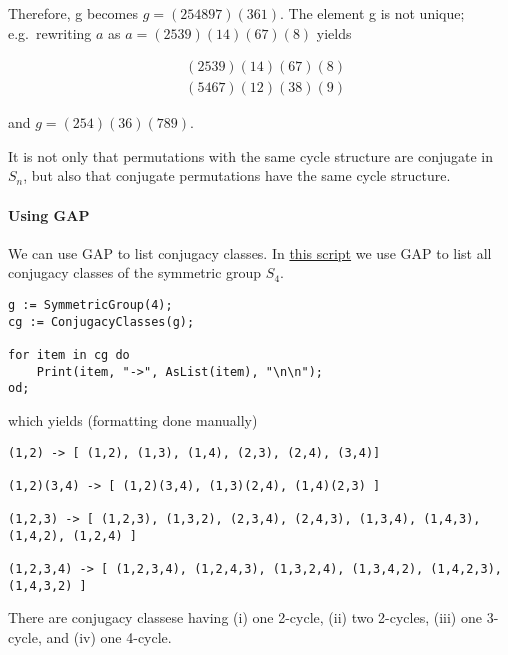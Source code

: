 Therefore, g becomes \(g=(254897)(361)\). The element g is not unique;
e.g.~rewriting \(a\) as \(a=(2539)(14)(67)(8)\) yields


\begin{align*}
&(2539)(14)(67)(8) \\
&(5467)(12)(38)(9)
\end{align*}


and \(g=(254)(36)(789)\).

It is not only that permutations with the same cycle structure are
conjugate in \(S_n\), but also that conjugate permutations have the same
cycle structure.

\paragraph{Using GAP}\label{using-gap}

We can use GAP to list conjugacy classes. In
\href{\%7Bfilename\%7D/files/conjugacy.g}{this script} we use GAP to
list all conjugacy classes of the symmetric group \(S_4\).

\begin{verbatim}
g := SymmetricGroup(4);
cg := ConjugacyClasses(g);

for item in cg do
    Print(item, "->", AsList(item), "\n\n");
od;
\end{verbatim}

which yields (formatting done manually)

\begin{verbatim}
(1,2) -> [ (1,2), (1,3), (1,4), (2,3), (2,4), (3,4)]

(1,2)(3,4) -> [ (1,2)(3,4), (1,3)(2,4), (1,4)(2,3) ]

(1,2,3) -> [ (1,2,3), (1,3,2), (2,3,4), (2,4,3), (1,3,4), (1,4,3), (1,4,2), (1,2,4) ]

(1,2,3,4) -> [ (1,2,3,4), (1,2,4,3), (1,3,2,4), (1,3,4,2), (1,4,2,3), (1,4,3,2) ]
\end{verbatim}

There are conjugacy classese having (i) one 2-cycle, (ii) two 2-cycles,
(iii) one 3-cycle, and (iv) one 4-cycle.
